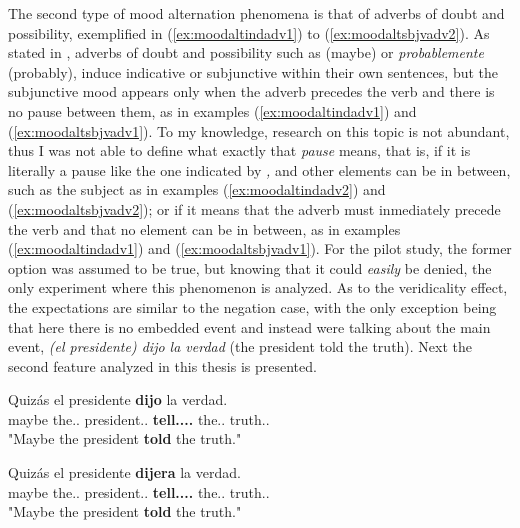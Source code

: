 The second type of mood alternation phenomena is that of adverbs of doubt and possibility, exemplified in (\ref{ex:moodaltindadv1}) to (\ref{ex:moodaltsbjvadv2}). As stated in \citet{espanola2010nueva}, adverbs of doubt and possibility such as  (maybe) or \textit{probablemente} (probably), induce indicative or subjunctive within their own sentences, but the subjunctive mood appears only when the adverb precedes the verb and there is no pause between them, as in examples (\ref{ex:moodaltindadv1}) and (\ref{ex:moodaltsbjvadv1}). To my knowledge, research on this topic is not abundant, thus I was not able to define what exactly that \textit{pause} means, that is, if it is literally a pause like the one indicated by \textit{,} and other elements can be in between, such as the subject as in examples (\ref{ex:moodaltindadv2}) and (\ref{ex:moodaltsbjvadv2}); or if it means that the adverb must inmediately precede the verb and that no element can be in between, as in examples (\ref{ex:moodaltindadv1}) and (\ref{ex:moodaltsbjvadv1}). For the pilot study, the former option was assumed to be true, but knowing that it could \textit{easily} be denied, the only experiment where this phenomenon is analyzed. As to the veridicality effect, the expectations are similar to the negation case, with the only exception being that here there is no embedded event and instead were talking about the main event, \textit{(el presidente) dijo la verdad} (the president told the truth). Next the second feature analyzed in this thesis is presented.\\

\begin{exe}
  \ex
    \begin{xlist}
      \item{\gll Quizás el presidente \textbf{dijo} la verdad.\\ maybe the.\M.\Sg{} president.\M.\Sg{} \textbf{tell.\Pst.\Pfv.\Ind.\Tsg{}} the.\F.\Sg{} truth.\F.\Sg{} \\ "Maybe the president \textbf{told} the truth."}\label{ex:moodaltindadv2}
      \item{\gll Quizás el presidente \textbf{dijera} la verdad.\\ maybe the.\M.\Sg{} president.\M.\Sg{} \textbf{tell.\Pst.\Pfv.\Sbjv.\Tsg{}} the.\F.\Sg{} truth.\F.\Sg{} \\ "Maybe the president \textbf{told} the truth."}\label{ex:moodaltsbjvadv2}
    \end{xlist}
\end{exe}

